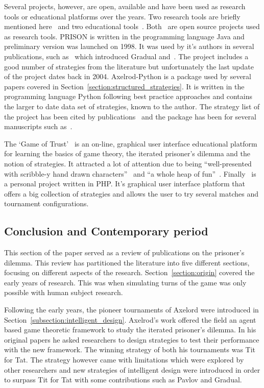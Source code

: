 \documentclass{article}
\theoremstyle{definition}
\begin{document}
Several projects, however, are open, available and have been used as research
tools or educational platforms over the years. Two research tools are briefly mentioned
here~\cite{prison, axelrodproject} and two educational tools~\cite{pd_trust, pd_game}.
Both~\cite{prison, axelrodproject} are open source projects used as research
tools. PRISON is written in the programming language Java and preliminary version
was launched on 1998. It was used by it's authors in several publications, such
as~\cite{Beaufils1997} which introduced Gradual and~\cite{Beaufils1988}. The project
includes a good number of strategies from the literature but unfortunately the
last update of the project dates back in 2004.
Axelrod-Python is a package used by several papers covered in Section~\ref{section:structured_strategies}.
It is written in the programming language Python following best practice
approaches and contains the larger to date data set of strategies, known to the
author. The strategy
list of the project has been cited by publications~\cite{Anastassacos2018,
Hayes2017, Neumann2018} and the package has been for several manuscripts
such as~\cite{Goodman2018, Wang2017}.

The `Game of Trust'~\cite{pd_trust} is an on-line, graphical user interface
educational platform for learning the basics of game theory, the iterated prisoner's
dilemma and the notion of strategies. It attracted a lot of attention due to
being ``well-presented with scribble-y hand drawn characters''~\cite{trust_blogb}
and ``a whole heap of fun''~\cite{trust_bloga}. Finally~\cite{pd_game} is a
personal project written in PHP. It's graphical user interface platform that offers
a big collection of strategies and allows the user to try several matches and
tournament configurations.

\subsection{Conclusion and Contemporary period}\label{section:contemporary_period}

This section of the paper served as a review of publications on the prisoner's
dilemma. This review has partitioned the literature into five different sections,
focusing on different aspects of the research. Section~\ref{section:origin}
covered the early years of research. This was when simulating turns of the game
was only possible with human subject research.

Following the early years, the pioneer tournaments of Axelord were introduced in
Section~\ref{subsection:intelligent_design}. Axelrod's work offered the field an
agent based game theoretic framework to study the iterated prisoner's dilemma.
In his original papers he asked researchers to design strategies to test their
performance with the new framework. The winning strategy of both his tournaments
was Tit for Tat. The strategy however came with limitations which were explored
by other researchers and new strategies of intelligent design were introduced in
order to surpass Tit for Tat with some contributions such as Pavlov and Gradual.
\end{document}
